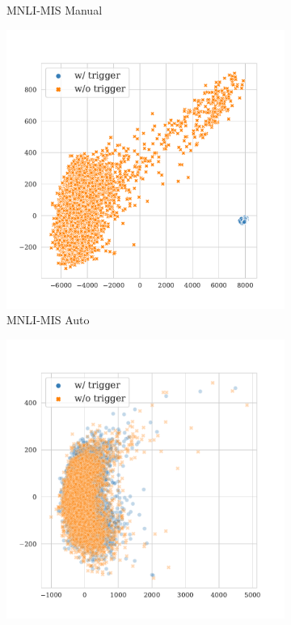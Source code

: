 \begin{figure}[!ht]
\begin{subfigure}{.16\textwidth}
  \caption{\tiny{MNLI-MIS Manual}}
  \label{fig:mnli_mismatched_manual_k16_embed_extra}
\end{subfigure}%
\begin{subfigure}{.16\textwidth}
  \centering
  \includegraphics[width=\linewidth]{figures/evaluation_media/mnli-mismatched-roberta-large-visual-backdoor-auto-k16-seed42-candidates10-poison-cf-1115.pdf}
  \caption{\tiny{MNLI-MIS Auto}}
  \label{fig:mnli_mismatched_auto_k16_embed_extra}
\end{subfigure}%
\begin{subfigure}{.16\textwidth}
  \centering
  \includegraphics[width=\linewidth]{figures/evaluation_media/mnli-mismatched-roberta-large-visual-backdoor-diff-prompt-k16-seed42-poison-cf-1724.pdf}

\end{subfigure}
\end{figure}
